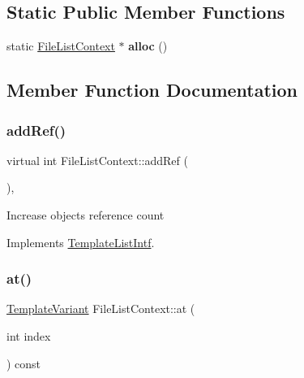 \subsection*{Static Public Member Functions}
\begin{DoxyCompactItemize}
\item 
\mbox{\label{class_file_list_context_ab1bd545a3b94e91b2572639892ae1f46}} 
static \mbox{\hyperlink{class_file_list_context}{File\+List\+Context}} $\ast$ {\bfseries alloc} ()
\end{DoxyCompactItemize}


\subsection{Member Function Documentation}
\mbox{\label{class_file_list_context_a8b193daaaccb88cee19db52c368d727a}} 
\subsubsection{\texorpdfstring{addRef()}{addRef()}}
{\footnotesize\ttfamily virtual int File\+List\+Context\+::add\+Ref (\begin{DoxyParamCaption}{ }\end{DoxyParamCaption})\hspace{0.3cm}{\ttfamily [inline]}, {\ttfamily [virtual]}}

Increase object\textquotesingle{}s reference count 

Implements \mbox{\hyperlink{class_template_list_intf_a4b4973e2e15396d10bc4e3085462ca2b}{Template\+List\+Intf}}.

\mbox{\label{class_file_list_context_ab0a889fd2011e3fbafc3271cd1d4c20f}} 
\subsubsection{\texorpdfstring{at()}{at()}}
{\footnotesize\ttfamily \mbox{\hyperlink{class_template_variant}{Template\+Variant}} File\+List\+Context\+::at (\begin{DoxyParamCaption}\item[{int}]{index }\end{DoxyParamCaption}) const\hspace{0.3cm}{\ttfamily [virtual]}}

